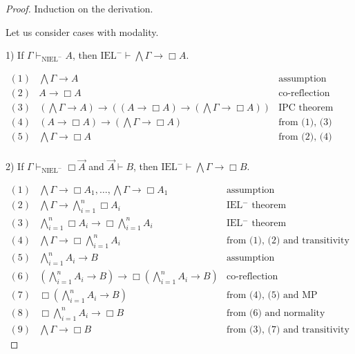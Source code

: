 \documentclass[a4paper]{article}
\begin{document}
  \begin{proof}
Induction on the derivation.

  \vspace{\baselineskip}

Let us consider cases with modality.

\vspace{\baselineskip}

1) If $\Gamma \vdash_{\text{NIEL}^{-}} A$, then $\text{IEL}^{-} \vdash \bigwedge \Gamma \rightarrow \Box A$.

$\begin{array}{lll}
(1) & \bigwedge \Gamma \rightarrow A & \text{assumption}\\
(2) & A \rightarrow \Box A &\text{co-reflection}\\
(3) & (\bigwedge \Gamma \rightarrow A) \rightarrow ((A \rightarrow \Box A) \rightarrow (\bigwedge \Gamma \rightarrow \Box A))&\text{IPC theorem}\\
(4) & (A \rightarrow \Box A) \rightarrow (\bigwedge \Gamma \rightarrow \Box A) &\text{from (1), (3) and MP}\\
(5) & \bigwedge \Gamma \rightarrow \Box A &\text{from (2), (4) and MP}\\
\end{array}$

\vspace{\baselineskip}

2) If $\Gamma \vdash_{\text{NIEL}^{-}} \Box \vec{A}$ and $\vec{A} \vdash B$, then $\text{IEL}^{-} \vdash \bigwedge \Gamma \rightarrow \Box B$.

$\begin{array}{lll}
(1) &\bigwedge \Gamma \rightarrow \Box A_1, \dots, \bigwedge \Gamma \rightarrow \Box A_1 & \text{assumption} \\
(2) &\bigwedge \Gamma \rightarrow \bigwedge \limits_{i = 1}^{n} \Box A_i & \text{IEL$^{-}$ theorem} \\
(3) &\bigwedge \limits_{i = 1}^{n} \Box A_i \rightarrow \Box \bigwedge \limits_{i = 1}^{n} A_i & \text{IEL$^{-}$ theorem} \\
(4) &\bigwedge \Gamma \rightarrow \Box \bigwedge \limits_{i = 1}^{n} A_i & \text{from (1), (2) and transitivity} \\
(5) &\bigwedge \limits_{i = 1}^{n} A_i \rightarrow B& \text{assumption} \\
(6) &(\bigwedge \limits_{i = 1}^{n} A_i \rightarrow B) \rightarrow \Box (\bigwedge \limits_{i = 1}^{n} A_i \rightarrow B)& \text{co-reflection}\\
(7) &\Box (\bigwedge \limits_{i = 1}^{n} A_i \rightarrow B)& \text{from (4), (5) and MP} \\
(8) &\Box \bigwedge \limits_{i = 1}^{n} A_i \rightarrow \Box B & \text{from (6) and normality} \\
(9) &\bigwedge \Gamma \rightarrow \Box B & \text{from (3), (7) and transitivity}
\end{array}$

  \end{proof}
\end{document}
